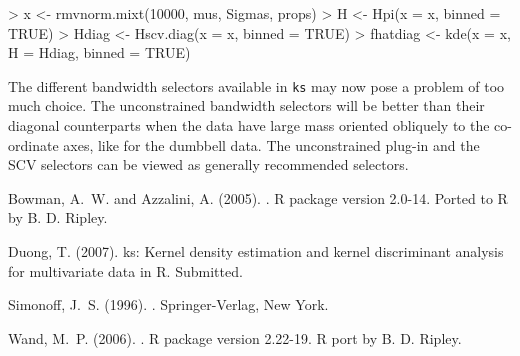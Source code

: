 \documentclass[a4paper,11pt]{article}
\let\pkg=\texttt
\begin{document}
\begin{Schunk}
\begin{Sinput}
> x <- rmvnorm.mixt(10000, mus, Sigmas, props)
> H <- Hpi(x = x, binned = TRUE)
> Hdiag <- Hscv.diag(x = x, binned = TRUE)
> fhatdiag <- kde(x = x, H = Hdiag, binned = TRUE)
\end{Sinput}
\end{Schunk}



The different bandwidth selectors available in \pkg{ks} may
now pose a problem of too much choice.
The unconstrained bandwidth selectors will be better than their diagonal counterparts
when the data have large mass oriented obliquely to the co-ordinate axes,
like for the dumbbell data. 
The unconstrained plug-in and the SCV selectors
can be viewed as generally recommended selectors.






\begin{thebibliography}{}

Bowman, A.~W. and Azzalini, A. (2005).
.
\newblock R package version 2.0-14. Ported to R by B. D. Ripley.

Duong, T. (2007).
\newblock ks: {K}ernel density estimation and kernel discriminant analysis for
  multivariate data in {R}.
\newblock Submitted.

Simonoff, J.~S. (1996).
.
\newblock Springer-Verlag, New York.

Wand, M.~P. (2006).
.
\newblock R package version 2.22-19. R port by B. D. Ripley.

\end{thebibliography}
\end{document}
